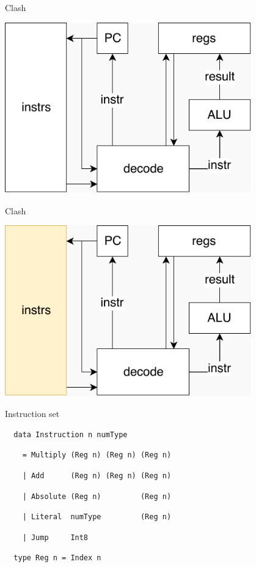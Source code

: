 \documentclass[10pt]{beamer}
\begin{document}
\begin{frame}[fragile]{Clash}
\begin{center}
\includegraphics[width=0.8\textwidth]{img/CPU.pdf}
\end{center}
\end{frame}

\begin{frame}[fragile]{Clash}
\begin{center}
\includegraphics[width=0.8\textwidth]{img/CPU-instrs.pdf}
\end{center}
\end{frame}

\begin{frame}[fragile]{Instruction set}
\begin{verbatim}
  data Instruction n numType
\end{verbatim}
\pause
\begin{verbatim}
    = Multiply (Reg n) (Reg n) (Reg n)
\end{verbatim}
\pause
\begin{verbatim}
    | Add      (Reg n) (Reg n) (Reg n)
\end{verbatim}
\pause
\begin{verbatim}
    | Absolute (Reg n)         (Reg n)
\end{verbatim}
\pause
\begin{verbatim}
    | Literal  numType         (Reg n)
\end{verbatim}
\pause
\begin{verbatim}
    | Jump     Int8
\end{verbatim}
\pause

\begin{verbatim}
  type Reg n = Index n
\end{verbatim}
\end{frame}
\end{document}
